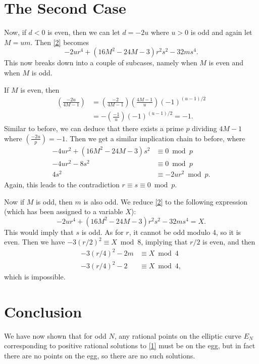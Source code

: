 \documentclass[12pt]{article}
\theoremstyle{definition}
\begin{document}
\section{The Second Case}
Now, if $d < 0$ is even, then we can let $d = -2u$ where $u > 0$ is odd and again let $M = um$.
Then \eqref{2} becomes \begin{equation*}
	-2ur^4 + (16M^2 - 24M - 3)r^2s^2 - 32ms^4.
\end{equation*}
This now breaks down into a couple of subcases, namely when $M$ is even and when $M$ is odd.

If $M$ is even, then \begin{align*}
	\left( \frac{-2u}{4M-1} \right) & = \left( \frac{-2}{4M-1} \right)\left( \frac{4M-1}{u} \right)(-1)^{(u-1)/2} \\
	                                & = -\left( \frac{-1}{u} \right)(-1)^{(u-1)/2} = -1.
\end{align*}
Similar to before, we can deduce that there exists a prime $p$ dividing $4M - 1$ where $\left( \frac{-2u}{p} \right) = -1$.
Then we get a similar implication chain to before, where \begin{align*}
	-4ur^2 + (16M^2 - 24M - 3)s^2 & \equiv 0 \bmod p       \\
	-4ur^2 - 8s^2                 & \equiv 0 \bmod p       \\
	4s^2                          & \equiv -2ur^2 \bmod p.
\end{align*}
Again, this leads to the contradiction $r \equiv s \equiv 0 \bmod p$.

Now if $M$ is odd, then $m$ is also odd.
We reduce \eqref{2} to the following expression (which has been assigned to a variable $X$): \begin{equation*}
	-2ur^4 + (16M^2 - 24M - 3)r^2s^2 - 32ms^4 = X.
\end{equation*}
This would imply that $s$ is odd.
As for $r$, it cannot be odd modulo 4, so it is even.
Then we have $-3(r/2)^2 \equiv X \bmod 8$, implying that $r/2$ is even, and then \begin{align*}
	-3(r/4)^2 - 2m & \equiv X \bmod 4 \\
	-3(r/4)^2 - 2  & \equiv X \bmod 4,
\end{align*}
which is impossible.

\section{Conclusion}
We have now shown that for odd $N$, any rational points on the elliptic curve $E_N$ corresponding to positive rational solutions to \eqref{1} must be on the egg, but in fact there are no points on the egg, so there are no such solutions.
\end{document}
